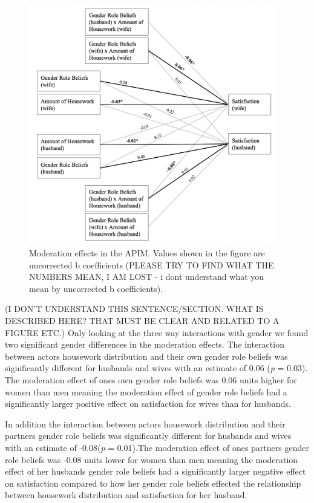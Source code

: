 \documentclass[
  man,floatsintext]{apa6}
\begin{document}
\begin{figure}
\includegraphics[width=4.25in]{moderation} \caption{Moderation effects in the APIM. Values shown in the figure are uncorrected b coefficients (PLEASE TRY TO FIND WHAT THE NUMBERS MEAN, I AM LOST - i dont understand what you mean by uncorrected b coefficients).}\label{fig:unnamed-chunk-9}
\end{figure}

(I DON'T UNDERSTAND THIS SENTENCE/SECTION. WHAT IS DESCRIBED HERE? THAT MUST BE CLEAR AND RELATED TO A FIGURE ETC.) Only looking at the three way interactions with gender we found two significant gender differences in the moderation effects. The interaction between actors housework distribution and their own gender role beliefs was significantly different for husbands and wives with an estimate of 0.06 (\emph{p} = 0.03). The moderation effect of ones own gender role beliefs was 0.06 units higher for women than men meaning the moderation effect of gender role beliefs had a significantly larger positive effect on satisfaction for wives than for husbands.

In addition the interaction between actors housework distribution and their partners gender role beliefs was significantly different for husbands and wives with an estimate of -0.08(\emph{p} = 0.01).The moderation effect of ones partners gender role beliefs was -0.08 units lower for women than men meaning the moderation effect of her husbands gender role beliefs had a significantly larger negative effect on satisfaction compared to how her gender role beliefs effected the relationship between housework distribution and satisfaction for her husband.
\end{document}
